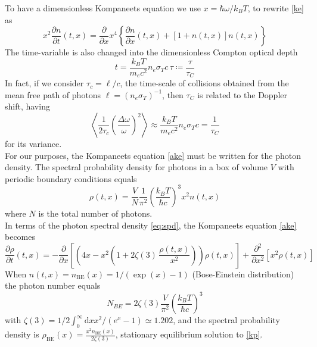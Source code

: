 \documentclass[a4paper,12pt,reqno,superscriptaddress,nofootinbib]{revtex4}
\theoremstyle{plain}
\theoremstyle{definition}
\theoremstyle{remark}
\newcommand{\id}{\textrm{d}}
\newcommand{\0}{^{(0)}}
\newcommand{\1}{^{(1)}}
\newcommand{\2}{^{(2)}}
\begin{document}
To have a dimensionless Kompaneets equation we use $x= \hbar \omega/k_B T$, to rewrite \eqref{ke} as
\begin{equation}\label{ake}
x^2\frac{\partial n}{\partial t}(t,x) = \frac{\partial }{\partial x}x^4\left\{
\frac{\partial n}{\partial x}(t,x) + 
\left[1+n(t,x)\right]n(t,x)\right\}
\end{equation}
The time-variable is also changed into the dimensionless Compton optical depth
\[
t = \frac{ k_B T }{m_e c^2} n_e \sigma_T c \, \tau\coloneqq \frac{ \tau}{\tau_C}
\]
In fact, if we consider $\tau_c = \ell/c$, the time-scale of collisions obtained from the mean free path of photons $\ell=(n_e\sigma_T)^{-1}$, then $\tau_C$ is related to the Doppler shift, having
\begin{equation}\label{shift}
\left\langle\frac{1}{2\tau_c}\left(\frac{\Delta\omega}{\omega}\right)^2\right\rangle\approx \frac{ k_B T }{m_e c^2} n_e \sigma_T c= \frac{1}{\tau_C}
\end{equation} 
for its variance.\\

For our purposes, the Kompaneets equation \eqref{ake} must be written for the photon density. The spectral probability density for photons in a box of volume $V$ with periodic boundary conditions equals
\begin{equation}\label{eq:spd}
\rho(t,x) = \frac{V}{N} \frac{1}{\pi^2} \left(\frac{k_B T}{\hbar c}\right)^3 
x^2 n(t,x)%
\end{equation}
where $N$ is the total number of photons.\\
In terms of the photon spectral density \eqref{eq:spd}, the Kompaneets equation \eqref{ake} becomes
\begin{equation}\label{kp}
\frac{\partial \rho}{\partial t} (t,x) = -\frac{\partial}{\partial x}\left[\left(4x- x^2\left(1+2\zeta(3) \,\frac{\rho(t,x)}{x^2}\right)\right)\rho(t,x)\right] + \frac{\partial^2}{\partial x^2}\left[x^2 \rho(t,x)\right]
\end{equation}
When $n(t,x)= n_\text{BE}(x) = 1 / (\exp(x) - 1)$ (Bose-Einstein distribution) the photon number 
equals
\[
N_{BE} = 2 \zeta(3) \frac{V}{\pi^2} \left( \frac{k_B T}{\hbar c} \right)^3
\]
with $\zeta(3) = 1/2 \int_0^\infty \id x x^2/(e^x-1) \simeq 1.202$, and the spectral probability density is $ \rho_\text{BE}(x) = \frac{x^2 n_\text{BE}(x)}{2\zeta(3)}$, stationary equilibrium solution to \eqref{kp}.
\end{document}

